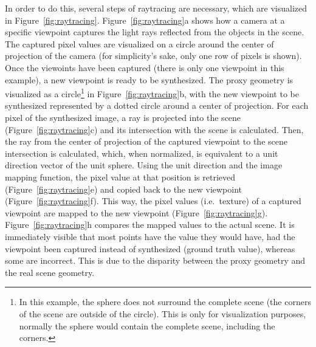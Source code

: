 
In order to do this, several steps of raytracing are necessary, which are visualized in Figure~\ref{fig:raytracing}. Figure~\ref{fig:raytracing}a shows how a camera at a specific viewpoint captures the light rays reflected from the objects in the scene. The captured pixel values are visualized on a circle around the center of projection of the camera (for simplicity's sake, only one row of pixels is shown). Once the viewoints have been captured (there is only one viewpoint in this example), a new viewpoint is ready to be synthesized. The proxy geometry is visualized as a circle\footnote{In this example, the sphere does not surround the complete scene (the corners of the scene are outside of the circle). This is only for visualization purposes, normally the sphere would contain the complete scene, including the corners.} in Figure~\ref{fig:raytracing}b, with the new viewpoint to be synthesized represented by a dotted circle around a center of projection. For each pixel of the synthesized image, a ray is projected into the scene (Figure~\ref{fig:raytracing}c) and its intersection with the scene is calculated. Then, the ray from the center of projection of the captured viewpoint to the scene intersection is calculated, which, when normalized, is equivalent to a unit direction vector of the unit sphere. Using the unit direction and the image mapping function, the pixel value at that position is retrieved (Figure~\ref{fig:raytracing}e) and copied back to the new viewpoint (Figure~\ref{fig:raytracing}f). This way, the pixel values (i.e.\ texture) of a captured viewpoint are mapped to the new viewpoint (Figure~\ref{fig:raytracing}g). Figure~\ref{fig:raytracing}h compares the mapped values to the actual scene. It is immediately visible that most points have the value they would have, had the viewpoint been captured instead of synthesized (ground truth value), whereas some are incorrect. This is due to the disparity between the proxy geometry and the real scene geometry.

